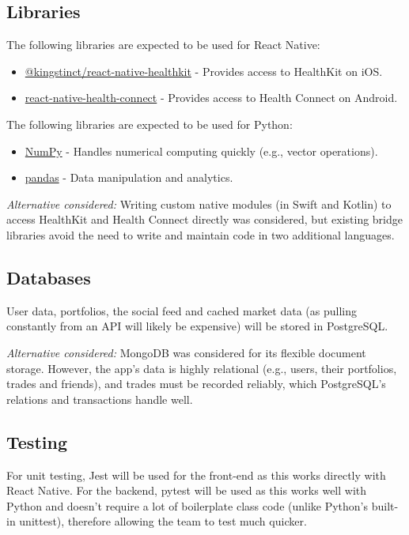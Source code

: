 \documentclass{article}
\begin{document}
\subsection{Libraries}
The following libraries are expected to be used for React Native:
\begin{itemize}
    \item \href{https://github.com/kingstinct/react-native-healthkit}{@kingstinct/react-native-healthkit} - Provides access to HealthKit on iOS.
    \item \href{https://github.com/matinzd/react-native-health-connect}{react-native-health-connect} - Provides access to Health Connect on Android.
\end{itemize}
The following libraries are expected to be used for Python:
\begin{itemize}
    \item \href{https://numpy.org}{NumPy} - Handles numerical computing quickly (e.g., vector operations).
    \item \href{https://pandas.pydata.org}{pandas} - Data manipulation and analytics.
\end{itemize}

\textit{Alternative considered:} Writing custom native modules (in Swift and Kotlin) to access HealthKit and Health Connect directly was considered, but existing bridge libraries avoid the need to
write and maintain code in two additional languages.

\subsection{Databases} \label{sec:databases}
User data, portfolios, the social feed and cached market data (as pulling constantly from an API will likely be expensive) will be stored in PostgreSQL.

\textit{Alternative considered:} MongoDB was considered for its flexible document storage. However, the app's data is highly relational (e.g., users, their portfolios, trades and friends), and trades must be
recorded reliably, which PostgreSQL's relations and transactions handle well.

\subsection{Testing}
For unit testing, Jest will be used for the front-end as this works directly with React Native. For the backend, pytest will be used as this works well with Python and doesn't require a lot of boilerplate class code
(unlike Python's built-in unittest), therefore allowing the team to test much quicker.
\end{document}

